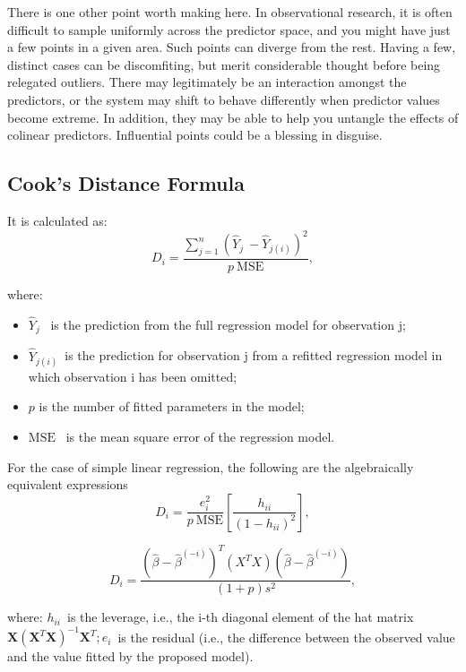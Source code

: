 \documentclass[residuals.tex]{subfiles}
\begin{document}
There is one other point worth making here. In observational research, it is often difficult to sample uniformly across the predictor space, and you might have just a few points in a given area. Such points can diverge from the rest. Having a few, distinct cases can be discomfiting, but merit considerable thought before being relegated outliers. There may legitimately be an interaction amongst the predictors, or the system may shift to behave differently when predictor values become extreme. In addition, they may be able to help you untangle the effects of colinear predictors. Influential points could be a blessing in disguise.
\newpage 

\subsection*{Cook's Distance Formula}
It is calculated as:
\[D_i = \frac{ \sum_{j=1}^n (\hat Y_j\ - \hat Y_{j(i)})^2 }{p \ \mathrm{MSE}},
\]

where:
\begin{itemize}
\item $\hat Y_j$ \, is the prediction from the full regression model for observation j;
\item $\hat Y_{j(i)}$\, is the prediction for observation j from a refitted regression model in which observation i has been omitted;
\item $p$ is the number of fitted parameters in the model;
\item $\mathrm{MSE} $ \, is the mean square error of the regression model.

\end{itemize}

For the case of simple linear regression, the following are the algebraically equivalent expressions 
\[D_i = \frac{e_i^2}{p \ \mathrm{MSE}}\left[\frac{h_{ii}}{(1-h_{ii})^2}\right],
\]

\[
D_i = \frac{ (\hat \beta - \hat {\beta}^{(-i)})^T(X^TX)(\hat \beta - \hat {\beta}^{(-i)}) } {(1+p)s^2},
\]

where:
$h_{ii} \,$ is the leverage, i.e., the i-th diagonal element of the hat matrix $\mathbf{X}\left(\mathbf{X}^T\mathbf{X}\right)^{-1}\mathbf{X}^T;
e_i \,$ is the residual (i.e., the difference between the observed value and the value fitted by the proposed model).

\end{document}
